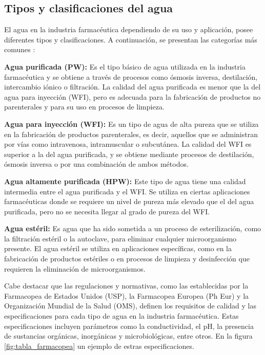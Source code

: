 \subsection{Tipos y clasificaciones del agua}

El agua en la industria farmacéutica dependiendo de su uso y aplicación, posee diferentes tipos y 
clasificaciones.
A continuación, se presentan las categorías más comunes \cite{setaphtTratamientosAguaPara}:

\textbf{Agua purificada (PW):} Es el tipo básico de agua utilizada en la industria farmacéutica y se obtiene a través de procesos como ósmosis inversa, destilación, intercambio iónico o filtración. La calidad del agua purificada es menor que la del agua para inyección (WFI), pero es adecuada para la fabricación de productos no parenterales y para su uso en procesos de limpieza.

\textbf{Agua para inyección (WFI):} Es un tipo de agua de alta pureza que se utiliza en la fabricación de productos parenterales, es decir, aquellos que se administran por vías como intravenosa, intramuscular o subcutánea. La calidad del WFI es superior a la del agua purificada, y se obtiene mediante procesos de destilación, ósmosis inversa o por una combinación de ambos métodos.

\textbf{Agua altamente purificada (HPW):} Este tipo de agua tiene una calidad intermedia entre el agua purificada y el WFI. Se utiliza en ciertas aplicaciones farmacéuticas donde se requiere un nivel de pureza más elevado que el del agua purificada, pero no se necesita llegar al grado de pureza del WFI.

\textbf{Agua estéril:} Es agua que ha sido sometida a un proceso de esterilización, como la filtración estéril o la autoclave, para eliminar cualquier microorganismo presente. El agua estéril se utiliza en aplicaciones específicas, como en la fabricación de productos estériles o en procesos de limpieza y desinfección que requieren la eliminación de microorganismos.

Cabe destacar que las regulaciones y normativas, como las establecidas por la Farmacopea de Estados Unidos (USP), la Farmacopea Europea (Ph Eur) y la Organización Mundial de la Salud (OMS), definen los requisitos de calidad y las especificaciones para cada tipo de agua en la industria farmacéutica. Estas especificaciones incluyen parámetros como la conductividad, el pH, la presencia de sustancias orgánicas, inorgánicas y microbiológicas, entre otros. En la figura \ref{fig:tabla_farmacopea} un ejemplo de estras especificaciones.


